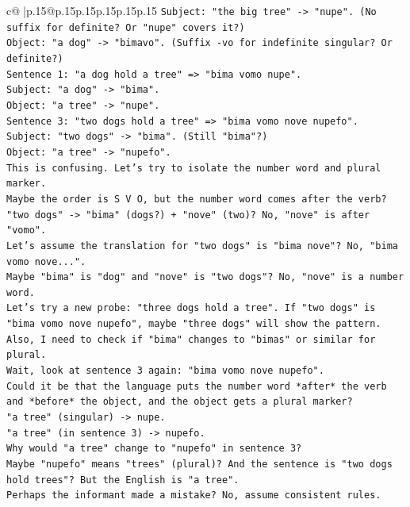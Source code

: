 \documentclass{article}
\begin{document}
{\begin{supertabular}{c@{$\;$}|p{.15\linewidth}@{}p{.15\linewidth}p{.15\linewidth}p{.15\linewidth}p{.15\linewidth}p{.15\linewidth}}
{{{\texttt{Subject: "the big tree" {-}> "nupe". (No suffix for definite? Or "nupe" covers it?)} \\
\texttt{Object: "a dog" {-}> "bimavo". (Suffix {-}vo for indefinite singular? Or definite?)} \\
\texttt{Sentence 1: "a dog hold a tree" => "bima vomo nupe".} \\
\texttt{Subject: "a dog" {-}> "bima".} \\
\texttt{Object: "a tree" {-}> "nupe".} \\
\texttt{Sentence 3: "two dogs hold a tree" => "bima vomo nove nupefo".} \\
\texttt{Subject: "two dogs" {-}> "bima". (Still "bima"?)} \\
\texttt{Object: "a tree" {-}> "nupefo".} \\
\texttt{This is confusing. Let's try to isolate the number word and plural marker.} \\
\texttt{Maybe the order is S V O, but the number word comes after the verb?} \\
\texttt{"two dogs" {-}> "bima" (dogs?) + "nove" (two)? No, "nove" is after "vomo".} \\
\texttt{Let's assume the translation for "two dogs" is "bima nove"? No, "bima vomo nove...".} \\
\texttt{Maybe "bima" is "dog" and "nove" is "two dogs"? No, "nove" is a number word.} \\
\texttt{Let's try a new probe: "three dogs hold a tree". If "two dogs" is "bima vomo nove nupefo", maybe "three dogs" will show the pattern.} \\
\texttt{Also, I need to check if "bima" changes to "bimas" or similar for plural.} \\
\texttt{Wait, look at sentence 3 again: "bima vomo nove nupefo".} \\
\texttt{Could it be that the language puts the number word *after* the verb and *before* the object, and the object gets a plural marker?} \\
\texttt{"a tree" (singular) {-}> nupe.} \\
\texttt{"a tree" (in sentence 3) {-}> nupefo.} \\
\texttt{Why would "a tree" change to "nupefo" in sentence 3?} \\
\texttt{Maybe "nupefo" means "trees" (plural)? And the sentence is "two dogs hold trees"? But the English is "a tree".} \\
\texttt{Perhaps the informant made a mistake? No, assume consistent rules.} \\
}}}
\end{supertabular}}
\end{document}
